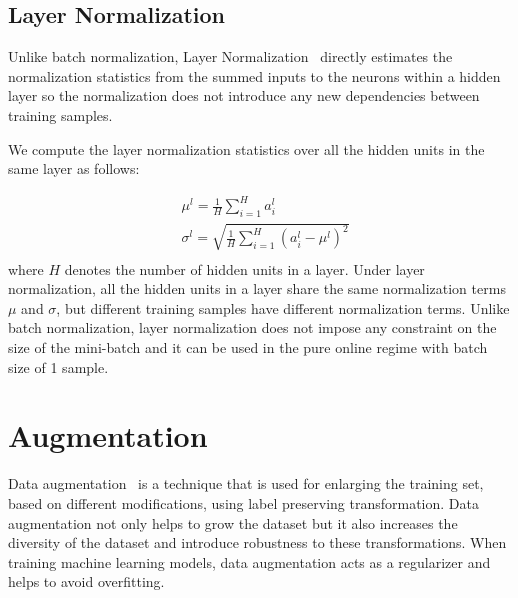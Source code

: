 \subsection{Layer Normalization}

Unlike batch normalization, Layer Normalization~\cite{ba2016layer} directly estimates the normalization statistics from the summed inputs to the neurons within a hidden layer so the normalization does not introduce any new dependencies between training samples.

We compute the layer normalization statistics over all the hidden units in the same layer as follows:

\begin{equation}
\begin{split}
    & \mu^{l} = \frac{1}{H}\sum^{H}_{i=1}a_{i}^{l}\\
    &  \sigma^{l} = \sqrt{\frac{1}{H}\sum^{H}_{i=1}\left(a_{i}^{l}-\mu^{l}\right)^{2}} \\
\end{split}
\end{equation}
where $H$ denotes the number of hidden units in a layer. Under layer normalization, all the hidden units in a layer share the same normalization terms $\mu$ and $\sigma$, but different training samples have different normalization terms. Unlike batch normalization, layer normalization does not impose any constraint on the size of the mini-batch and it can be used in the pure online regime with batch size of 1 sample.

\section{Augmentation}
Data augmentation~\cite{balestriero2022effects} is a technique that is  used for enlarging the training set, based on different modifications, using label preserving transformation. Data augmentation not only helps to grow the dataset but it also increases the diversity of the dataset and introduce  robustness to these transformations. When training machine learning models, data augmentation acts as a regularizer and helps to avoid overfitting.

